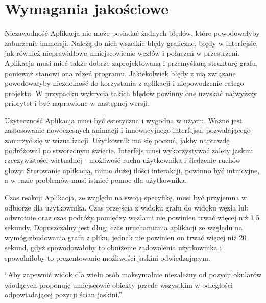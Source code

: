 \section{Wymagania jakościowe}
Niezawodność
Aplikacja nie może posiadać żadnych błędów, które powodowałyby zaburzenie immersji. Należą do nich wszelkie błędy graficzne, błędy w interfejsie, jak również nieprawidłowe umiejscowienie węzłów i połączeń w przestrzeni. Aplikacja musi mieć także dobrze zaprojektowaną i przemyślaną strukturę grafu, ponieważ stanowi ona rdzeń programu. Jakiekolwiek błędy z nią związane powodowałyby niezdolność do korzystania z aplikacji i niepowodzenie całego projektu. W przypadku wykrycia takich błędów powinny one uzyskać najwyższy priorytet i być naprawione w następnej wersji.

Użyteczność
Aplikacja musi być estetyczna i wygodna w użyciu. Ważne jest zastosowanie nowoczesnych animacji i innowacyjnego interfejsu, pozwalającego zanurzyć się w wizualizacji. Użytkownik ma się poczuć, jakby naprawdę podróżował po stworzonym świecie. Interfejs musi wykorzystywać zalety jaskini rzeczywistości wirtualnej - możliwość ruchu użytkownika i śledzenie ruchów głowy. Sterowanie aplikacją, mimo dużej ilości interakcji, powinno być intuicyjne, a w razie problemów musi istnieć pomoc dla użytkownika.


Czas reakcji
Aplikacja, ze względu na swoją specyfikę, musi być przyjemna w odbiorze dla użytkownika. Czas przejścia z widoku grafu do widoku węzła lub odwrotnie oraz czas podróży pomiędzy węzłami nie powinien trwać więcej niż 1,5 sekundy. Dopuszczalny jest długi czas uruchamiania aplikacji ze względu na wymóg zbudowania grafu z pliku, jednak nie powinien on trwać więcej niż 20 sekund, gdyż spowodowałoby to obniżenie zadowolenia użytkownika i spowolniłoby to prezentowanie możliwości jaskini odwiedzającym. 

“Aby zapewnić widok dla wielu osób maksymalnie niezależny od pozycji okularów wiodących proponuję umiejscowić obiekty przede wszystkim w odległości odpowiadającej pozycji ścian jaskini.”
